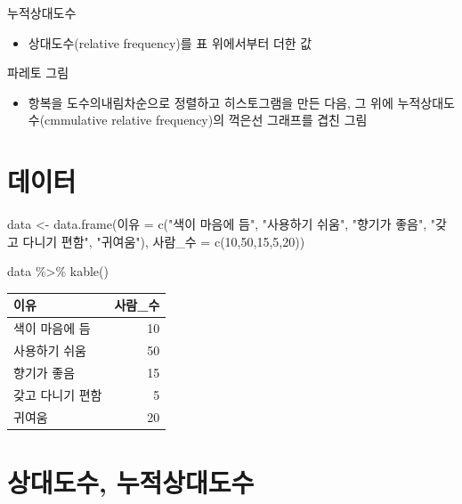 \documentclass[
  letterpaper,
  DIV=11,
  numbers=noendperiod]{scrreprt}
\newenvironment{Shaded}{\begin{snugshade}}{\end{snugshade}}
\newcommand{\DecValTok}[1]{\textcolor[rgb]{0.68,0.00,0.00}{#1}}
\newcommand{\FunctionTok}[1]{\textcolor[rgb]{0.28,0.35,0.67}{#1}}
\newcommand{\NormalTok}[1]{\textcolor[rgb]{0.00,0.23,0.31}{#1}}
\newcommand{\OtherTok}[1]{\textcolor[rgb]{0.00,0.23,0.31}{#1}}
\newcommand{\SpecialCharTok}[1]{\textcolor[rgb]{0.37,0.37,0.37}{#1}}
\newcommand{\StringTok}[1]{\textcolor[rgb]{0.13,0.47,0.30}{#1}}
\providecommand{\tightlist}{%
  \setlength{\itemsep}{0pt}\setlength{\parskip}{0pt}}\usepackage{longtable,booktabs,array}
\begin{document}
누적상대도수

\begin{itemize}
\tightlist
\item
  상대도수(relative frequency)를 표 위에서부터 더한 값
\end{itemize}

파레토 그림

\begin{itemize}
\tightlist
\item
  항복을 도수의내림차순으로 정렬하고 히스토그램을 만든 다음, 그 위에
  누적상대도수(cmmulative relative frequency)의 꺽은선 그래프를 겹친
  그림
\end{itemize}

\hypertarget{uxb370uxc774uxd130}{%
\section{데이터}\label{uxb370uxc774uxd130}}

\begin{Shaded}
\begin{Highlighting}[]
\NormalTok{data }\OtherTok{\textless{}{-}} \FunctionTok{data.frame}\NormalTok{(이유 }\OtherTok{=} \FunctionTok{c}\NormalTok{(}\StringTok{"색이 마음에 듬"}\NormalTok{, }\StringTok{"사용하기 쉬움"}\NormalTok{, }\StringTok{"향기가 좋음"}\NormalTok{, }\StringTok{"갖고 다니기 편함"}\NormalTok{, }\StringTok{"귀여움"}\NormalTok{),}
\NormalTok{           사람\_수 }\OtherTok{=} \FunctionTok{c}\NormalTok{(}\DecValTok{10}\NormalTok{,}\DecValTok{50}\NormalTok{,}\DecValTok{15}\NormalTok{,}\DecValTok{5}\NormalTok{,}\DecValTok{20}\NormalTok{))}

\NormalTok{data }\SpecialCharTok{\%\textgreater{}\%} \FunctionTok{kable}\NormalTok{()}
\end{Highlighting}
\end{Shaded}

\begin{longtable}[]{@{}lr@{}}
\toprule\noalign{}
이유 & 사람\_수 \\
\midrule\noalign{}
\endhead
\bottomrule\noalign{}
\endlastfoot
색이 마음에 듬 & 10 \\
사용하기 쉬움 & 50 \\
향기가 좋음 & 15 \\
갖고 다니기 편함 & 5 \\
귀여움 & 20 \\
\end{longtable}

\hypertarget{uxc0c1uxb300uxb3c4uxc218-uxb204uxc801uxc0c1uxb300uxb3c4uxc218}{%
\section{상대도수,
누적상대도수}\label{uxc0c1uxb300uxb3c4uxc218-uxb204uxc801uxc0c1uxb300uxb3c4uxc218}}
\end{document}
